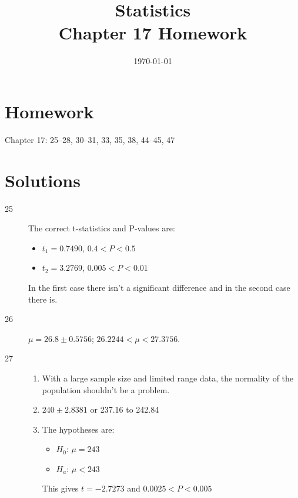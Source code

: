 \documentclass[letterpaper, landscape]{exam}
\title{Statistics \\ Chapter 17 Homework}
\date{\today}
\author{}
\begin{document}
  \maketitle

  \section{Homework}
  Chapter 17: 25--28, 30--31, 33, 35, 38, 44--45, 47

  \ifprintanswers{}
    \section{Solutions}
    \begin{description}

      \item[25] 
        The correct t-statistics and P-values are:
        \begin{itemize}[nosep, label={}]
          \item $t_1 = 0.7490$, $0.4 < P < 0.5$
          \item $t_2 = 3.2769$, $0.005 < P < 0.01 $
        \end{itemize}

        In the first case there isn't a significant difference and in the second case
        there is.

      \item[26] $\mu = 26.8 \pm 0.5756$; $26.2244 < \mu < 27.3756$.

      \item[27]
        \begin{enumerate}[label = (\alph*)]
          \item With a large sample size and limited range data, the normality
            of the population shouldn't be a problem.

          \item $240 \pm 2.8381$ or 237.16 to 242.84

          \item 
            The hypotheses are:
            \begin{itemize}[parsep=0pt,label={}]
              \item $H_0$: $\mu = 243$
              \item $H_a$: $\mu < 243$
            \end{itemize}
            
            This gives $t = -2.7273$ and $0.0025 < P < 0.005$


\end{enumerate}
\end{description}
\end{document}
